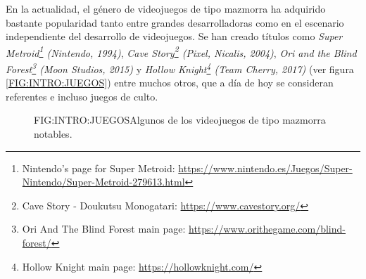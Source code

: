En la actualidad, el género de videojuegos de tipo mazmorra ha adquirido bastante popularidad tanto entre grandes desarrolladoras como en el escenario independiente del desarrollo de videojuegos. Se han creado títulos como \textit{Super Metroid\footnote{Nintendo's page for Super Metroid: \url{https://www.nintendo.es/Juegos/Super-Nintendo/Super-Metroid-279613.html}} (Nintendo, 1994)}, \textit{Cave Story\footnote{Cave Story - Doukutsu Monogatari: \url{https://www.cavestory.org/}} (Pixel, Nicalis, 2004)}, \textit{Ori and the Blind Forest\footnote{Ori And The Blind Forest main page: \url{https://www.orithegame.com/blind-forest/}} (Moon Studios, 2015)} y \textit{Hollow Knight\footnote{Hollow Knight main page: \url{https://hollowknight.com/}} (Team Cherry, 2017)} (ver figura \ref{FIG:INTRO:JUEGOS}) entre muchos otros, que a día de hoy se consideran referentes e incluso juegos de culto.\newline
\begin{figure}{FIG:INTRO:JUEGOS}{Algunos de los videojuegos de tipo mazmorra notables.}
	 \quad
	 \quad
	 \quad
\end{figure}

